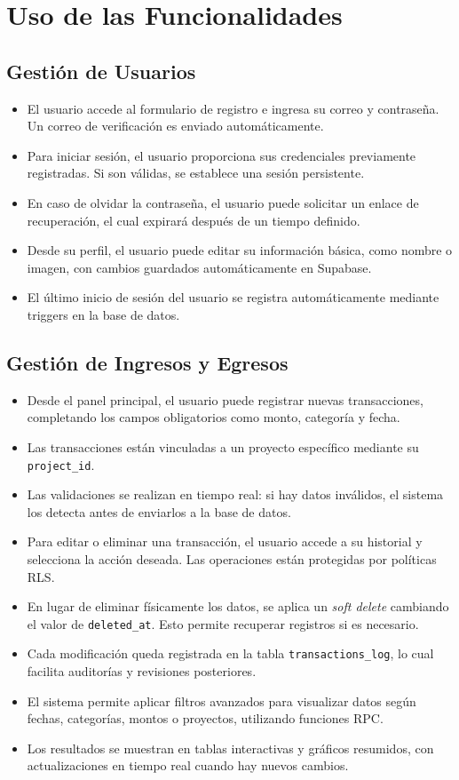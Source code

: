 \section{Uso de las Funcionalidades}

\subsection{Gestión de Usuarios}
\begin{itemize}
    \item El usuario accede al formulario de registro e ingresa su correo y contraseña. Un correo de verificación es enviado automáticamente.
    \item Para iniciar sesión, el usuario proporciona sus credenciales previamente registradas. Si son válidas, se establece una sesión persistente.
    \item En caso de olvidar la contraseña, el usuario puede solicitar un enlace de recuperación, el cual expirará después de un tiempo definido.
    \item Desde su perfil, el usuario puede editar su información básica, como nombre o imagen, con cambios guardados automáticamente en Supabase.
    \item El último inicio de sesión del usuario se registra automáticamente mediante triggers en la base de datos.
\end{itemize}

\subsection{Gestión de Ingresos y Egresos}
\begin{itemize}
    \item Desde el panel principal, el usuario puede registrar nuevas transacciones, completando los campos obligatorios como monto, categoría y fecha.
    \item Las transacciones están vinculadas a un proyecto específico mediante su \texttt{project\_id}.
    \item Las validaciones se realizan en tiempo real: si hay datos inválidos, el sistema los detecta antes de enviarlos a la base de datos.
    \item Para editar o eliminar una transacción, el usuario accede a su historial y selecciona la acción deseada. Las operaciones están protegidas por políticas RLS.
    \item En lugar de eliminar físicamente los datos, se aplica un \textit{soft delete} cambiando el valor de \texttt{deleted\_at}. Esto permite recuperar registros si es necesario.
    \item Cada modificación queda registrada en la tabla \texttt{transactions\_log}, lo cual facilita auditorías y revisiones posteriores.
    \item El sistema permite aplicar filtros avanzados para visualizar datos según fechas, categorías, montos o proyectos, utilizando funciones RPC.
    \item Los resultados se muestran en tablas interactivas y gráficos resumidos, con actualizaciones en tiempo real cuando hay nuevos cambios.
\end{itemize}

